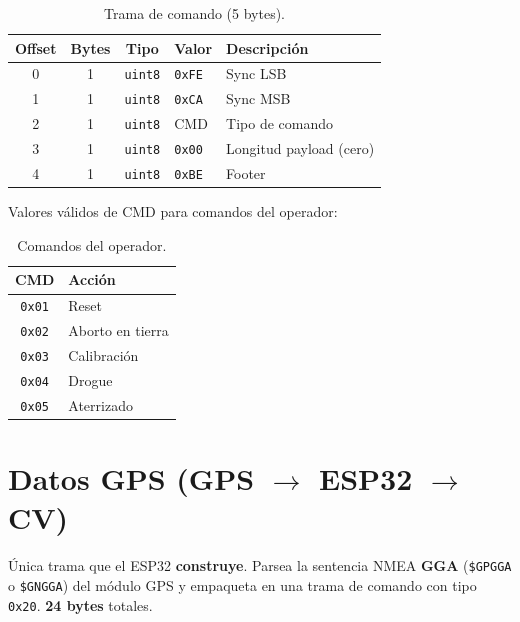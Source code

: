 \documentclass[11pt,a4paper]{article}
\begin{document}
\begin{table}[h]
\centering
\begin{tabular}{@{}cccll@{}}
\toprule
\textbf{Offset} & \textbf{Bytes} & \textbf{Tipo} & \textbf{Valor} & \textbf{Descripción} \\
\midrule
0 & 1 & \texttt{uint8} & \texttt{0xFE} & Sync LSB \\
1 & 1 & \texttt{uint8} & \texttt{0xCA} & Sync MSB \\
2 & 1 & \texttt{uint8} & CMD            & Tipo de comando \\
3 & 1 & \texttt{uint8} & \texttt{0x00}  & Longitud payload (cero) \\
4 & 1 & \texttt{uint8} & \texttt{0xBE}  & Footer \\
\bottomrule
\end{tabular}
\caption{Trama de comando (5 bytes).}
\end{table}

Valores válidos de CMD para comandos del operador:

\begin{table}[h]
\centering
\begin{tabular}{@{}cl@{}}
\toprule
\textbf{CMD} & \textbf{Acción} \\
\midrule
\texttt{0x01} & Reset \\
\texttt{0x02} & Aborto en tierra \\
\texttt{0x03} & Calibración \\
\texttt{0x04} & Drogue \\
\texttt{0x05} & Aterrizado \\
\bottomrule
\end{tabular}
\caption{Comandos del operador.}
\end{table}


\section{Datos GPS (GPS $\rightarrow$ ESP32 $\rightarrow$ CV)}

Única trama que el ESP32 \textbf{construye}. Parsea la sentencia NMEA \textbf{GGA} (\texttt{\$GPGGA} o \texttt{\$GNGGA}) del módulo GPS y empaqueta en una trama de comando con tipo \texttt{0x20}. \textbf{24 bytes} totales.
\end{document}
